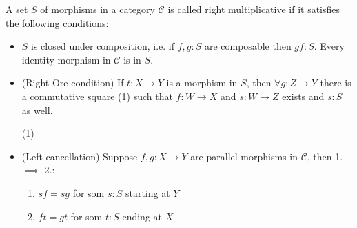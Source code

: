     \begin{definition}
        A set $S$ of morphisms in a category $\mathcal{C}$ is called right multiplicative if it satisfies the following conditions:
        \begin{itemize}
            \item $S$ is closed under composition, i.e. if $f,g : S$ are composable then $gf : S$. Every identity morphism in $\mathcal{C}$ is in $S$.
            \item (Right Ore condition) If $t : X \rightarrow Y$ is a morphism in $S$, then $\forall g:Z\rightarrow Y$ there is a commutative square (1) such that $f:W\rightarrow X$ and $s:W\rightarrow Z$ exists and $s:S$ as well.
            \begin{center}
                (1)
            \end{center}
            \item (Left cancellation) Suppose $f,g:X\rightarrow Y$ are parallel morphisms in $\mathcal{C}$, then 1. $\implies$ 2.:
            \begin{enumerate}
                \item $sf = sg$ for som $s:S$ starting at $Y$
                \item $ft = gt$ for som $t:S$ ending at $X$
            \end{enumerate}
        \end{itemize}
    \end{definition}

